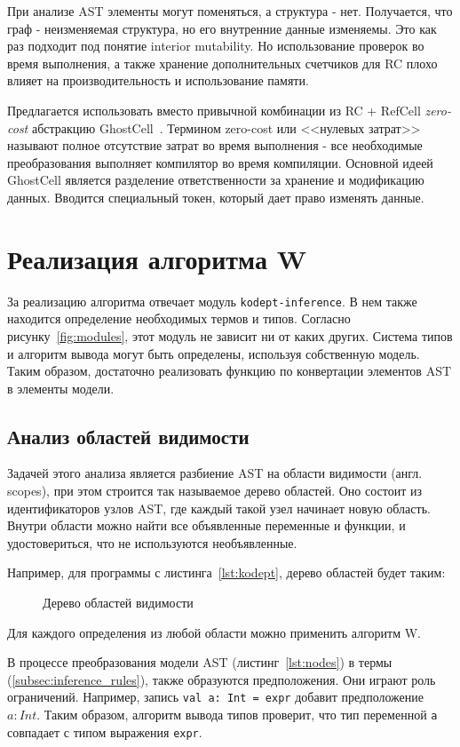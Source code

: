 При анализе AST элементы могут поменяться, а структура - нет.
Получается, что граф - неизменяемая структура, но его внутренние данные изменяемы.
Это как раз подходит под понятие interior mutability.
Но использование проверок во время выполнения, а также хранение дополнительных счетчиков для RC плохо влияет на производительность и использование памяти.

Предлагается использовать вместо привычной комбинации из RC + RefCell \textit{zero-cost} абстракцию GhostCell~\cite{GhostCell}.
Термином zero-cost или <<нулевых затрат>> называют полное отсутствие затрат во время выполнения - все необходимые преобразования выполняет компилятор во время компиляции.
Основной идеей GhostCell является разделение ответственности за хранение и модификацию данных.
Вводится специальный токен, который дает право изменять данные.

\section{Реализация алгоритма W}
\label{sec:algorithm_W}

За реализацию алгоритма отвечает модуль \lstinline{kodept-inference}.
В нем также находится определение необходимых термов и типов.
Согласно рисунку~\ref{fig:modules}, этот модуль не зависит ни от каких других.
Система типов и алгоритм вывода могут быть определены, используя собственную модель.
Таким образом, достаточно реализовать функцию по конвертации элементов AST в элементы модели.

\subsection{Анализ областей видимости}
\label{subsec:scope_analysis}

Задачей этого анализа является разбиение AST на области видимости (англ. scopes), при этом строится так называемое дерево областей.
Оно состоит из идентификаторов узлов AST, где каждый такой узел начинает новую область.
Внутри области можно найти все объявленные переменные и функции, и удостовериться, что не используются необъявленные.

Например, для программы с листинга~\ref{lst:kodept}, дерево областей будет таким:

\begin{figure}[H]
    \centering
    
    \caption{Дерево областей видимости}
    \label{fig:scopes}
\end{figure}

Для каждого определения из любой области можно применить алгоритм W.

В процессе преобразования модели AST (листинг~\ref{lst:nodes}) в термы (\ref{subsec:inference_rules}), также образуются предположения.
Они играют роль ограничений.
Например, запись \lstinline{val a: Int = expr} добавит предположение $a: Int$.
Таким образом, алгоритм вывода типов проверит, что тип переменной \lstinline{a} совпадает с типом выражения \lstinline{expr}.

